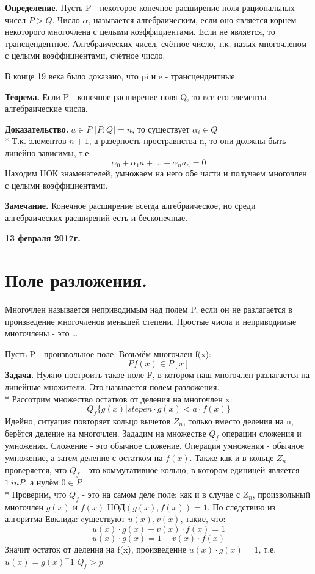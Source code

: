 \documentclass{article}
\begin{document}
{\bf Определение.} Пусть P - некоторое конечное расширение поля рациональных чисел $P>Q$. Число $\alpha$, называется алгебраическим, если оно является корнем некоторого многочлена с целыми коэффициентами. Если не является, то трансцендентное. Алгебраических чисел, счётное число, т.к. назых многочленом с целыми коэффициентами, счётное число.

В конце 19 века было доказано, что pi и e - трансцендентные.

{\bf Теорема.} Если P - конечное расширение поля Q, то все его элементы - алгебраические числа.

{\bf Доказательство.} $a\in P$   $\mid P:Q\mid=n$, то существует    $\alpha_i\in Q$\\*
Т.к. элементов $n+1$, а разерность простравнства n, то они должны быть линейно зависимы, т.е. $$\alpha_0+\alpha_1a+\ldots+\alpha_na_n=0$$ Находим НОК знаменателей, умножаем на него обе части и получаем многочлен с целыми коэффициентами.

{\bf Замечание.} Конечное расширение всегда алгебраическое, но среди алгебраических расширений есть и бесконечные.

\textbf {13 февраля 2017г.}
\section*{Поле разложения.}
Многочлен называется неприводимым над полем P, если он не разлагается в произведение многочленов меньшей степени. Простые числа и неприводимые многочлены - это \ldots

Пусть P - произвольное поле. Возьмём многочлен f(x): $$P     f(x) \in P[x]$$
{\bf Задача.} Нужно построить такое поле F, в котором наш многочлен разлагается на линейные множители. Это называется полем разложения.\\*
Рассотрим множество остатков от деления на многочлен x: $$Q_f\{g(x)| stepen\cdot g(x)<a\cdot f(x)\} $$
Идейно, ситуация повторяет кольцо вычетов $Z_n$, только вместо деления на n, берётся деление на многочлен. Зададим на множестве $Q_f$ операции сложения и умножения. Сложение - это обычное сложение. Операция умножения - обычное умножение, а затем деление с остатком на $f(x)$. Также  как и в кольце $Z_n$ проверяется, что $Q_f$ - это коммутативное кольцо, в котором единицей является $1 \ in P$, а нулём $0 \in P$\\*
Проверим, что $Q_f$ - это на самом деле поле: как и в случае с $Z_n$, произвольный многочлен $g(x)$ и $f(x)$   НОД$(g(x),f(x))=1$. По следствию из алгоритма Евклида: cуществуют $u(x), v(x)$, такие, что:
$$u(x)\cdot g(x)+v(x)\cdot f(x)=1$$
$$u(x)\cdot g(x)=1-v(x)\cdot f(x)$$
Значит остаток от деления на f(x), произведение $u(x)\cdot g(x)=1$, т.е. $u(x)=g(x)^-1$     $Q_f>p$
\end{document}
